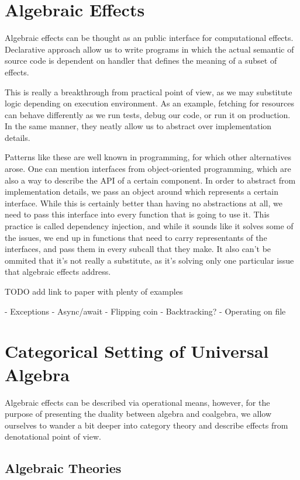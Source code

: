 \documentclass[declaration,shortabstract]{iithesis}
\theoremstyle{definition} \newtheorem{definition}{Definition}[chapter]
\theoremstyle{remark} \newtheorem{remark}[definition]{Observation}
\theoremstyle{plain} \newtheorem{theorem}[definition]{Theorem}
\theoremstyle{plain} \newtheorem{lemma}[definition]{Lemma}
\begin{document}
\section{Algebraic Effects}

Algebraic effects can be thought as an public interface for computational effects.
Declarative approach allow us to write programs in which the actual semantic of
source code is dependent on handler that defines the meaning of a subset of effects.

This is really a breakthrough from practical point of view, as we may substitute
logic depending on execution environment. As an example, fetching for resources
can behave differently as we run tests, debug our code, or run it on production.
In the same manner, they neatly allow us to abstract over implementation details.

Patterns like these are well known in programming, for which other alternatives
arose. One can mention interfaces from object-oriented programming, which are also
a way to describe the API of a certain component. In order to abstract from
implementation details, we pass an object around which represents a certain
interface. While this is certainly better than having no abstractions at all,
we need to pass this interface into every function that is going to use it.
This practice is called dependency injection, and while it sounds like it solves
some of the issues, we end up in functions that need to carry representants
of the interfaces, and pass them in every subcall that they make. It also can't
be ommited that it's not really a substitute, as it's solving only one particular
issue that algebraic effects address.

TODO add link to paper with plenty of examples

- Exceptions
- Async/await
- Flipping coin
- Backtracking?
- Operating on file

\section{Categorical Setting of Universal Algebra}

Algebraic effects can be described via operational means, however,
for the purpose of presenting the duality between algebra and coalgebra,
we allow ourselves to wander a bit deeper into category theory and describe
effects from denotational point of view.

    \subsection{Algebraic Theories}
\end{document}
